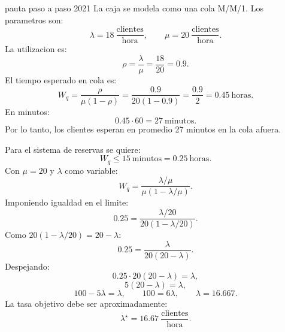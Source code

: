 \begin{pautacompleta}{pauta paso a paso 2021}
La caja se modela como una cola M/M/1. Los parametros son:
\[
  \lambda=18\ \frac{\text{clientes}}{\text{hora}},
  \qquad
  \mu=20\ \frac{\text{clientes}}{\text{hora}}.
\]
La utilizacion es:
\[
  \rho=\frac{\lambda}{\mu}=\frac{18}{20}=0.9.
\]
El tiempo esperado en cola es:
\[
  W_q=\frac{\rho}{\mu(1-\rho)}
  =\frac{0.9}{20(1-0.9)}
  =\frac{0.9}{2}
  =0.45\ \text{horas}.
\]
En minutos:
\[
  0.45\cdot 60=27\ \text{minutos}.
\]
Por lo tanto, los clientes esperan en promedio 27 minutos en la cola afuera.

Para el sistema de reservas se quiere:
\[
  W_q\leq 15\ \text{minutos}=0.25\ \text{horas}.
\]
Con $\mu=20$ y $\lambda$ como variable:
\[
  W_q=\frac{\lambda/\mu}{\mu(1-\lambda/\mu)}.
\]
Imponiendo igualdad en el limite:
\[
  0.25=\frac{\lambda/20}{20(1-\lambda/20)}.
\]
Como $20(1-\lambda/20)=20-\lambda$:
\[
  0.25=\frac{\lambda}{20(20-\lambda)}.
\]
Despejando:
\[
  0.25\cdot 20(20-\lambda)=\lambda,
\]
\[
  5(20-\lambda)=\lambda,
\]
\[
  100-5\lambda=\lambda,
  \qquad
  100=6\lambda,
  \qquad
  \lambda=16.667.
\]
La tasa objetivo debe ser aproximadamente:
\[
  \lambda^\star=16.67\ \frac{\text{clientes}}{\text{hora}}.
\]
\end{pautacompleta}

